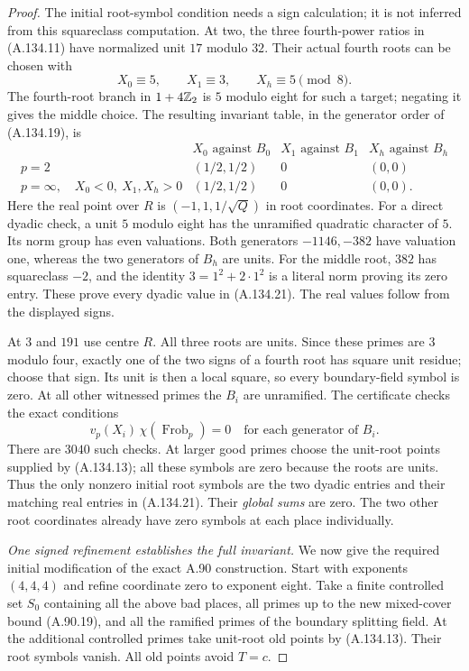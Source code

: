 \begin{proof}
The initial root-symbol condition needs a sign
calculation; it is not inferred from this
squareclass computation.
At two, the three fourth-power ratios in
(A.134.11) have normalized unit $17$ modulo $32$.
Their actual fourth roots can be chosen with
\[
                  X_0\equiv5,\qquad X_1\equiv3,\qquad
                  X_h\equiv5\pmod8.
\tag{A.134.20}
\]
The fourth-root branch in $1+4\mathbb Z_2$ is $5$
modulo eight for such a target; negating it
gives the middle choice.
The resulting invariant table, in the generator
order of (A.134.19), is
\[
 \begin{array}{c|ccc}
    &X_0\text{ against }B_0&X_1\text{ against }B_1&
                                      X_h\text{ against }B_h\\ \hline
 p=2&(1/2,1/2)&0&(0,0)\\
 p=\infty,\quad X_0<0,\ X_1,X_h>0&(1/2,1/2)&0&(0,0).
 \end{array}
\tag{A.134.21}
\]
Here the real point over $R$ is
$(-1,1,1/\sqrt Q)$ in root coordinates.
For a direct dyadic check, a unit $5$ modulo eight
has the unramified quadratic character of $5$.
Its norm group has even valuations.
Both generators $-1146,-382$ have valuation one,
whereas the two generators of $B_h$ are units.
For the middle root, $382$ has squareclass $-2$,
and the identity $3=1^2+2\cdot1^2$ is a literal
norm proving its zero entry.
These prove every dyadic value in (A.134.21).
The real values follow from the displayed signs.

At $3$ and $191$ use centre $R$.
All three roots are units.
Since these primes are $3$ modulo four, exactly
one of the two signs of a fourth root has square
unit residue; choose that sign.
Its unit is then a local square, so every
boundary-field symbol is zero.
At all other witnessed primes the $B_i$ are
unramified.
The certificate checks the exact conditions
\[
       v_p(X_i)\,\chi(\operatorname{Frob}_p)=0
             \quad\text{for each generator of }B_i.
\tag{A.134.22}
\]
There are $3040$ such checks.
At larger good primes choose the unit-root
points supplied by (A.134.13); all these symbols
are zero because the roots are units.
Thus the only nonzero initial root symbols are
the two dyadic entries and their matching real
entries in (A.134.21).
Their \emph{global sums} are zero.
The two other root coordinates already have
zero symbols at each place individually.

\emph{One signed refinement establishes the full invariant.}
We now give the required initial modification
of the exact A.90 construction.
Start with exponents $(4,4,4)$ and refine
coordinate zero to exponent eight.
Take a finite controlled set $S_0$ containing
all the above bad places, all primes up to the
new mixed-cover bound (A.90.19), and all the
ramified primes of the boundary splitting field.
At the additional controlled primes take
unit-root old points by (A.134.13).
Their root symbols vanish.
All old points avoid $T=c$.


\end{proof}
